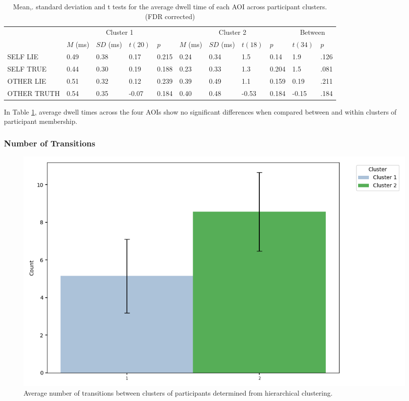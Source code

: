 \documentclass[man, floatsintext]{apa7}
\begin{document}
\begin{table}[H]
	\centering
	\begin{tabular}{|p{1.4cm}|p{1cm}|p{1cm}|p{1cm}|p{1cm}|p{1cm}|p{1cm}|p{1cm}|p{1cm}|p{1cm}|p{1cm}|}
		\hline
		\multirow{2}{*}{} & \multicolumn{4}{c|}{Cluster 1} & \multicolumn{4}{c|}{Cluster 2} & \multicolumn{2}{c|}{Between} \\ \cline{2-11}
		& $M$ (ms) &$SD$ (ms) & $t(20)$ & $p$ & $M$ (ms) & $SD$ (ms) & $t(18)$ & $p$ & $t(34)$ & $p$ \\ \hline
		\small{SELF LIE}& 0.49 & 0.38 & 0.17 & 0.215 & 0.24 & 0.34 & 1.5 & 0.14 & 1.9 & .126  \\ \hline
		\small{SELF TRUE} & 0.44 & 0.30 & 0.19 & 0.188 & 0.23 & 0.33 & 1.3 & 0.204 & 1.5 & .081  \\ \hline
		\small{OTHER LIE} & 0.51 & 0.32 & 0.12 & 0.239 & 0.39 & 0.49 & 1.1 & 0.159 & 0.19 & .211 \\ \hline
		\small{OTHER TRUTH} & 0.54 & 0.35 & -0.07 & 0.184 & 0.40 & 0.48 & -0.53 & 0.184& -0.15 & .184 \\ \hline
	\end{tabular}
	\vspace{0.3cm}
	\caption{Mean,. standard deviation and t tests for the average dwell time of each AOI across participant clusters. (FDR corrected)}
	\label{tab:NetLossDwellByPID}
\end{table}


In Table \ref{tab:NetLossDwellByPID}, average dwell times across the four AOIs show no significant differences when compared between and within clusters of participant membership.

\subsubsection{Number of Transitions}

 \begin{figure}[H]
	\includegraphics[width=\linewidth]{../plots/PID/NTransitions.png}
	\caption{Average number of transitions between clusters of participants determined from hierarchical clustering.}
	\label{fig:NTransitionsByPIDCluster}
\end{figure}
\end{document}
